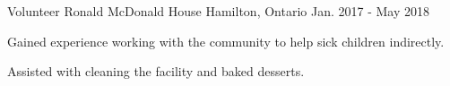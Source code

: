 \begin{cventries}
  \cventry
    {Volunteer} %
    {Ronald McDonald House} %
    {Hamilton, Ontario} %
    {Jan. 2017 - May 2018} %
    {
      \begin{cvitems} %
        \item {Gained experience working with the community to help sick children indirectly.}
        \item {Assisted with cleaning the facility and baked desserts.}
      \end{cvitems}
    }


\end{cventries}
